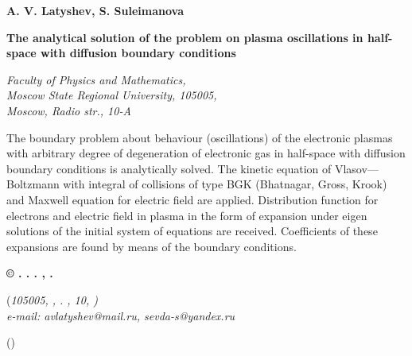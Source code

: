\documentclass[12pt, a4paper]{article}
\begin{document}
\large
\newcommand{\mc}[1]{\mathcal{#1}}
\newcommand{\E}{\mc{E}}
\renewcommand{\refname}{\begin{center} \center \rm  \end{center}}

\centerline{\bf A. V. Latyshev, S. Suleimanova}

\begin{center}
{\bf  The analytical solution of the problem on plasma oscillations in half-space
with diffusion boundary conditions}
\end{center}


\begin{center}
{\it Faculty of Physics and Mathematics,\\ Moscow State Regional
University, 105005,\\ Moscow, Radio str., 10-A}
\end{center}\medskip


\noindent The boundary problem about behaviour (oscillations) of the electronic plasmas
with arbitrary degree of degeneration of electronic gas in half-space with
diffusion boundary conditions is analytically solved.  The kinetic equation of
Vlasov---Boltzmann with integral of collisions of type BGK (Bhatnagar, Gross, Krook) and
Maxwell equation for electric field are applied.
Distribution  function for electrons and electric field in plasma in the form of
expansion under eigen  solutions of the initial system of equations  are received.
Coefficients of these expansions are found by means of the boundary conditions. \bigskip

\bigskip




\begin{center}
{\bf         
   }
\end{center}


\centerline{\bf \copyright {} . \quad . . , . }

\begin{center}
  {(\it 105005, , . , 10, )\\
e-mail: avlatyshev@mail.ru, sevda-s@yandex.ru\\}
\end{center}


\noindent       () 
         
\end{document}
